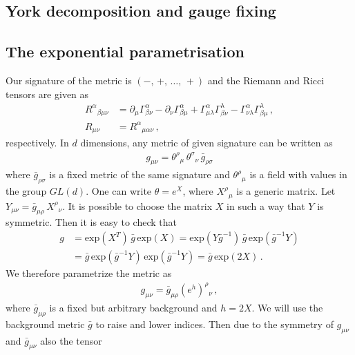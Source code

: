 \documentclass[11pt]{book} %
\renewcommand{\a}{\alpha}
\renewcommand{\b}{\beta}
\newcommand{\G}{\Gamma}
\numberwithin{equation}{chapter}
\begin{document}
\appendix
\begin{appendices}

\chapter{York decomposition and gauge fixing}
\label{app:York}

\section{The exponential parametrisation}

Our signature of the metric is $(-,\, +,\, \dots,\, +)$ and the Riemann and Ricci tensors are given as
\begin{align}
  R^\a{}_{\b\mu\nu} &= \partial_\mu \Gamma^{\alpha}_{\beta\nu} - \partial_\nu \Gamma^{\alpha}_{\beta\mu}
                       + \Gamma^{\alpha}_{\mu\lambda} \Gamma^{\lambda}_{\beta\nu} - \Gamma^{\alpha}_{\nu\lambda} \G^{\lambda}_{\beta\mu} \,, \\
  R_{\mu\nu} &= R^\alpha{}_{\mu \alpha \nu} \,,
\end{align}
respectively.
In $d$ dimensions, any metric of given signature can be written as
\begin{align}
  g_{\mu\nu} = \theta^\rho{}_\mu \, \theta^\sigma{}_\nu  \, \bar g_{\rho\sigma}
\end{align}
where $\bar g_{\rho \sigma}$ is a fixed metric of the same signature
and $\theta^\rho{}_\mu$ is a field with values in the group $GL(d)$.
One can write $\theta=e^X$, where $X^\rho{}_\mu$ is a generic matrix.
Let $Y_{\mu\nu} = \bar g_{\mu\rho} \, X^\rho{}_\nu$.
It is possible to choose the matrix $X$ in such a way that $Y$ is symmetric.
Then it is easy to check that
\begin{align}
  g &= \mathrm{exp}( X^T ) \, \bar g \, \mathrm{exp}(X)
    = \mathrm{exp}(Y \bar{g}^{-1}) \, \bar g \, \mathrm{exp}(\bar g^{-1}Y) \nonumber \\
    &= \bar g \, \mathrm{exp}(\bar g^{-1}Y) \, \mathrm{exp}(\bar g^{-1}Y)
    = \bar g \, \mathrm{exp}(2X) \,.
\end{align}
We therefore parametrize the metric as
\begin{align}
  \label{decomp}
  g_{\mu\nu} = \bar g_{\mu\rho} (e^h)^\rho{}_\nu \,,
\end{align}
where $\bar g_{\mu\rho}$ is a fixed but arbitrary background and $h=2X$.
We will use the background metric $\bar g$ to raise and lower indices.
Then due to the symmetry of $g_{\mu\nu}$ and $\bar g_{\mu\nu}$ also the tensor

\end{appendices}
\end{document}
